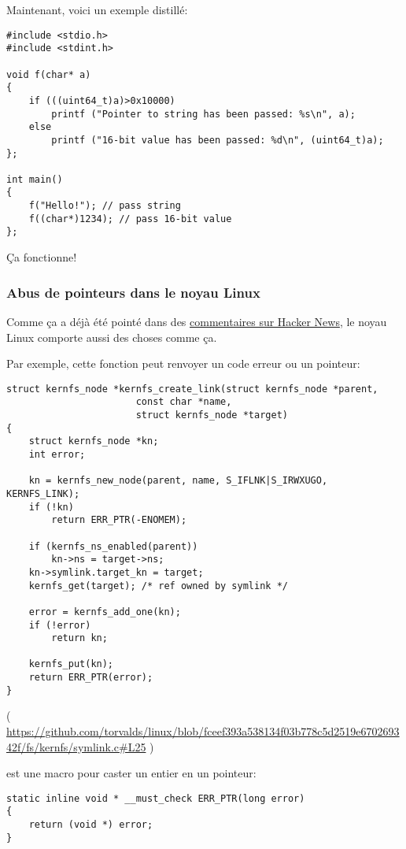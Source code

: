 Maintenant, voici un exemple distillé:

\begin{lstlisting}[style=customc]
#include <stdio.h>
#include <stdint.h>

void f(char* a)
{
	if (((uint64_t)a)>0x10000)
		printf ("Pointer to string has been passed: %s\n", a);
	else
		printf ("16-bit value has been passed: %d\n", (uint64_t)a);
};

int main()
{
	f("Hello!"); // pass string
	f((char*)1234); // pass 16-bit value
};
\end{lstlisting}

Ça fonctionne!

\subsubsection{Abus de pointeurs dans le noyau Linux}

Comme ça a déjà été pointé dans des \href{https://news.ycombinator.com/item?id=11823647}{commentaires sur Hacker News},
le noyau Linux comporte aussi des choses comme ça.

Par exemple, cette fonction peut renvoyer un code erreur ou un pointeur:

\begin{lstlisting}[style=customc]
struct kernfs_node *kernfs_create_link(struct kernfs_node *parent,
				       const char *name,
				       struct kernfs_node *target)
{
	struct kernfs_node *kn;
	int error;

	kn = kernfs_new_node(parent, name, S_IFLNK|S_IRWXUGO, KERNFS_LINK);
	if (!kn)
		return ERR_PTR(-ENOMEM);

	if (kernfs_ns_enabled(parent))
		kn->ns = target->ns;
	kn->symlink.target_kn = target;
	kernfs_get(target);	/* ref owned by symlink */

	error = kernfs_add_one(kn);
	if (!error)
		return kn;

	kernfs_put(kn);
	return ERR_PTR(error);
}
\end{lstlisting}

( \url{https://github.com/torvalds/linux/blob/fceef393a538134f03b778c5d2519e670269342f/fs/kernfs/symlink.c#L25} )

 est une macro pour caster un entier en un pointeur:

\begin{lstlisting}[style=customc]
static inline void * __must_check ERR_PTR(long error)
{
	return (void *) error;
}
\end{lstlisting}


